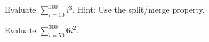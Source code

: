 \documentclass[../main.tex]{subfiles}
\begin{document}

\begin{exercise}
  Evaluate \(\sum_{i=10}^{100} i^{3}\).
  \hfill {\footnotesize Hint: Use the split/merge property.}

\end{exercise}

\begin{exercise}
  Evaluate \(\sum_{i=50}^{300} 6 i^{2}\).

\end{exercise}
\end{document}
